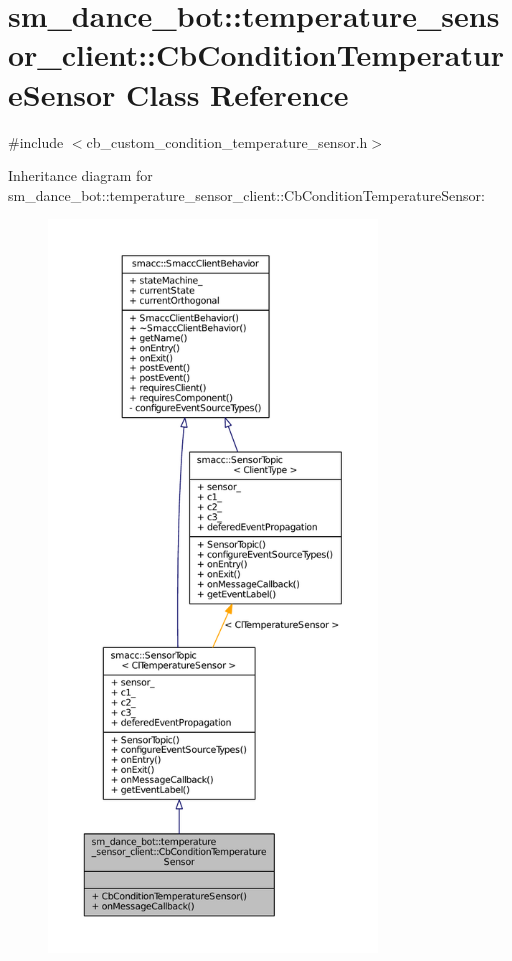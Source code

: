 \hypertarget{classsm__dance__bot_1_1temperature__sensor__client_1_1CbConditionTemperatureSensor}{}\section{sm\+\_\+dance\+\_\+bot\+:\+:temperature\+\_\+sensor\+\_\+client\+:\+:Cb\+Condition\+Temperature\+Sensor Class Reference}
\label{classsm__dance__bot_1_1temperature__sensor__client_1_1CbConditionTemperatureSensor}


{\ttfamily \#include $<$cb\+\_\+custom\+\_\+condition\+\_\+temperature\+\_\+sensor.\+h$>$}



Inheritance diagram for sm\+\_\+dance\+\_\+bot\+:\+:temperature\+\_\+sensor\+\_\+client\+:\+:Cb\+Condition\+Temperature\+Sensor\+:
\nopagebreak
\begin{figure}[H]
\begin{center}
\leavevmode
\includegraphics[height=550pt]{classsm__dance__bot_1_1temperature__sensor__client_1_1CbConditionTemperatureSensor__inherit__graph}
\end{center}
\end{figure}



